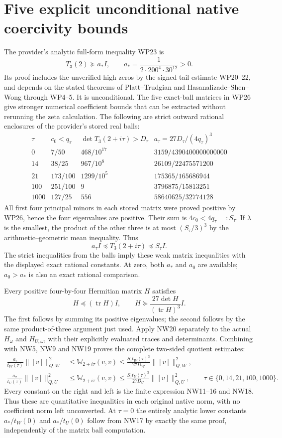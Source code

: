 \documentclass[11pt]{article}
\newcommand{\tr}{\operatorname{tr}}
\begin{document}
\section{Five explicit unconditional native coercivity bounds}
The provider's analytic full-form inequality WP23 is
\[
 T_3(2)\succeq a_*I,\qquad
 a_*=\frac1{2\cdot200^4\cdot30^{12}}>0.
 \tag{NW17}
\]
Its proof includes the unverified high zeros by the signed
tail estimate WP20--22, and depends on the stated theorems
of Platt--Trudgian and Hasanalizade--Shen--Wong through
WP4--5. It is unconditional. The five exact-ball matrices
in WP26 give stronger numerical coefficient bounds that
can be extracted without rerunning the zeta calculation.
The following are strict outward rational enclosures of
the provider's stored real balls:
\[
\begin{array}{c|c|c|c}
 \tau&c_0<q_\tau&\det T_3(2+i\tau)>D_\tau&
       a_\tau=27D_\tau/(4q_\tau)^3\\\hline
 0&7/50&468/10^{17}&3159/4390400000000000\\
 14&38/25&967/10^8&26109/22475571200\\
 21&173/100&1299/10^5&175365/165686944\\
 100&251/100&9&3796875/15813251\\
 1000&127/25&556&58640625/32774128
\end{array}
\tag{NW18}
\]
All first four principal minors in each stored matrix were
proved positive by WP26, hence the four eigenvalues are
positive. Their sum is $4c_0<4q_\tau=:S_\tau$. If
$\lambda$ is the smallest, the product of the other three
is at most $(S_\tau/3)^3$ by the arithmetic--geometric
mean inequality. Thus
\[
 a_\tau I\preceq T_3(2+i\tau)\preceq S_\tau I.
 \tag{NW19}
\]
The strict inequalities from the balls imply these weak
matrix inequalities with the displayed exact rational
constants. At zero, both $a_*$ and $a_0$ are available;
$a_0>a_*$ is also an exact rational comparison.

Every positive four-by-four Hermitian matrix $H$ satisfies
\[
 H\preceq(\tr H)I,\qquad
 H\succeq\frac{27\det H}{(\tr H)^3}I.
 \tag{NW20}
\]
The first follows by summing its positive eigenvalues;
the second follows by the same product-of-three argument
just used. Apply NW20 separately to the actual $H_\omega$
and $H_{U,\omega}$, with their explicitly evaluated
traces and determinants. Combining with NW5, NW9 and
NW19 proves the complete two-sided quotient estimates:
\[
\boxed{\begin{aligned}
 \frac{a_\tau}{t_W(\tau)}\|[v]\|_{Q,W}^2
 &\le\mathbb W_{2+i\tau}(v,v)
 \le\frac{S_\tau t_W(\tau)^3}{27D_W}\|[v]\|_{Q,W}^2,\\
 \frac{a_\tau}{t_U(\tau)}\|[v]\|_{Q,U}^2
 &\le\mathbb W_{2+i\tau}(v,v)
 \le\frac{S_\tau t_U(\tau)^3}{27D_U}\|[v]\|_{Q,U}^2,
 \qquad\tau\in\{0,14,21,100,1000\}.
\end{aligned}}\tag{NW21}
\]
Every constant on the right and left is the finite expression
NW11--16 and NW18. Thus these are quantitative inequalities
in each original native norm, with no coefficient norm left
unconverted. At $\tau=0$ the entirely analytic lower
constants $a_*/t_W(0)$ and $a_*/t_U(0)$ follow from
NW17 by exactly the same proof, independently of the
matrix ball computation.
\end{document}
